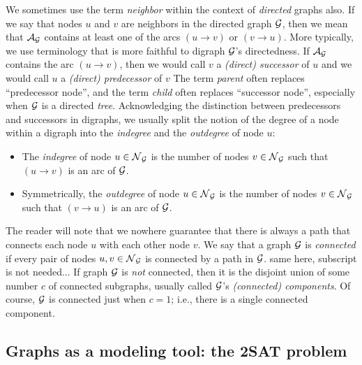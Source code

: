 We sometimes use the term {\it neighbor} within the context of {\em
  directed} graphs also.  If we say that nodes $u$ and $v$ are
neighbors in the directed graph $\mbox{$\cal G$}$,
then we mean that $\mbox{$\cal A$}_{\mbox{{\scriptsize $\cal G$}}}$ contains at least one of the arcs $(u
  \rightarrow v)$ or $(v \rightarrow u)$.  More typically, we use
  terminology that is more faithful to digraph $\mbox{$\cal G$}$'s directedness.
If $\mbox{$\cal A$}_{\mbox{{\scriptsize $\cal G$}}}$ contains the arc $(u \rightarrow v)$, then we would call
  $v$ a {\it (direct) successor} of $u$
and we would call $u$ a {\it (direct) predecessor} of $v$
The term {\it parent} often replaces ``predecessor node'', and the
term {\it child} often replaces ``successor node'', especially when
$\mbox{$\cal G$}$ is a directed {\em tree}.  Acknowledging the distinction between
predecessors and successors in digraphs, we usually split the notion
of the degree of a node within a digraph into the {\it indegree} and
the {\it outdegree} of node $u$:
\begin{itemize}
\item
The {\it indegree} of node $u \in \mbox{$\cal N$}_{\mbox{{\scriptsize $\cal G$}}}$
is the number of nodes $v \in \mbox{$\cal N$}_{\mbox{{\scriptsize $\cal G$}}}$ such that $(u \rightarrow v)$
is an arc of $\mbox{$\cal G$}$.
\item
Symmetrically, the {\it outdegree} of node $u \in \mbox{$\cal N$}_{\mbox{{\scriptsize $\cal G$}}}$
is the number of nodes $v \in \mbox{$\cal N$}_{\mbox{{\scriptsize $\cal G$}}}$ such that $(v \rightarrow u)$
is an arc of $\mbox{$\cal G$}$.
\end{itemize}

\smallskip

The reader will note that we nowhere guarantee that there is always a
path that connects each node $u$ with each other node $v$.  We say
that a graph $\mbox{$\cal G$}$ is {\it connected}  if every
pair of nodes $u, v \in \mbox{$\cal N$}_{\mbox{{\scriptsize $\cal G$}}}$ is connected by a path in $\mbox{$\cal G$}$.  
{\Denis same here, subscript is not needed...}
If graph $\mbox{$\cal G$}$ is {\em not} connected, then it is the disjoint union of
some number $c$ of connected subgraphs, usually called $\mbox{$\cal G$}$'s {\it
  (connected) components}.   Of
course, $\mbox{$\cal G$}$ is connected just when $c=1$; i.e., there is a single
connected component.



\subsection{Graphs as a modeling tool: the {\sf 2SAT} problem}
\label{sec:graph-model-2SAT}

